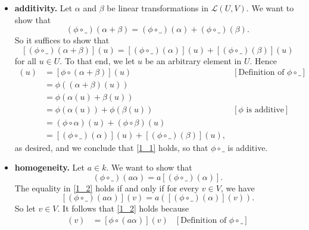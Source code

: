 \documentclass[9pt]{article}
\begin{document}
\begin{enumerate}
      \begin{itemize}
         \item \textbf{additivity.} Let $\alpha$ and $\beta$ be linear
               transformations in $\mathcal{L}(U, V)$. We want to show that
               \begin{equation} \label{1_1}
                  (\phi\circ\_)(\alpha+\beta) = (\phi\circ\_)(\alpha) +
                  (\phi\circ\_)(\beta).
               \end{equation}
               So it suffices to show that
               $$[(\phi\circ\_)(\alpha+\beta)](u) = [(\phi\circ\_)(\alpha)](u) +
                 [(\phi\circ\_)(\beta)](u)$$
               for all $u \in U$. To that end, we let $u$ be an arbitrary
               element in $U$. Hence
               \begin{align*}
                  [(\phi\circ\_)(\alpha+\beta)](u) &=
                     [\phi\circ(\alpha+\beta)](u)
                        &[\text{Definition of }\phi\circ\_ ] \\
                     &= \phi((\alpha+\beta)(u)) \\
                     &= \phi(\alpha(u)+\beta(u)) \\
                     &= \phi(\alpha(u))+\phi(\beta(u))
                        &[\phi \text{ is additive}] \\
                     &= (\phi\circ\alpha)(u)+(\phi\circ\beta)(u) \\
                     &= [(\phi\circ\_)(\alpha)](u) + [(\phi\circ\_)(\beta)](u),
               \end{align*}
               as desired, and we conclude that \eqref{1_1} holds, so that
               $\phi\circ\_$ is additive.
         \item \textbf{homogeneity.} Let $a \in k$. We want to show that
               \begin{equation} \label{1_2}
                  (\phi\circ\_)(a\alpha) = a[(\phi\circ\_)(\alpha)].
               \end{equation}
               The equality in \eqref{1_2} holds if and only if for every
               $v \in V$, we have
               $$[(\phi\circ\_)(a\alpha)](v) = a([(\phi\circ\_)(\alpha)](v)).$$
               So let $v \in V$. It follows that \eqref{1_2} holds because
               \begin{align*}
                  [(\phi\circ\_)(a\alpha)](v) &= [\phi\circ(a\alpha)](v)
                     &[\text{Definition of }\phi\circ\_ ] \\

\end{align*}
\end{itemize}
\end{enumerate}
\end{document}
